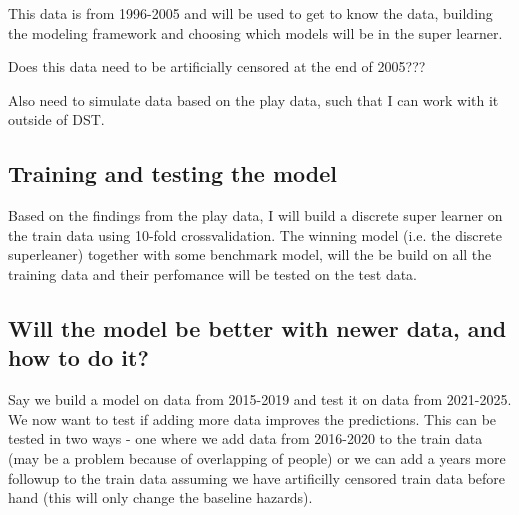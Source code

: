 \documentclass[11pt]{article}
\begin{document}
This data is from 1996-2005 and will be used to get to know the data, building the modeling framework and choosing which models will be in the super learner.

Does this data need to be artificially censored at the end of 2005???

Also need to simulate data based on the play data, such that I can work with it outside of DST.

\subsection{Training and testing the model}
\label{sec:orgec9194d}

Based on the findings from the play data, I will build a discrete super learner on the train data using 10-fold crossvalidation. The winning model (i.e. the discrete superleaner) together with some benchmark model, will the be build on all the training data and their perfomance will be tested on the test data. 

\subsection{Will the model be better with newer data, and how to do it?}
\label{sec:orgca25b44}

Say we build a model on data from 2015-2019 and test it on data from 2021-2025. We now want to test if adding more data improves the predictions. This can be tested in two ways - one where we add data from 2016-2020 to the train data (may be a problem because of overlapping of people) or we can add a years more followup to the train data assuming we have artificilly censored train data before hand (this will only change the baseline hazards). 
\end{document}
